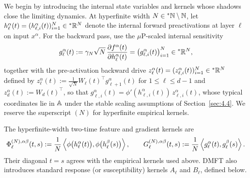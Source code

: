 We begin by introducing the internal state variables and kernels whose shadows close the limiting dynamics. At hyperfinite width $N \in {}^*\mathbb{N} \setminus \mathbb{N}$, let $h_\ell^\alpha(t) = (h_{\ell, i}^\alpha(t))_{i=1}^N \in {}^*\mathbb{R}^N$ denote the internal forward preactivations at layer $\ell$ on input $x^\alpha$. For the backward pass, use the $\mu$P-scaled internal sensitivity
\begin{equation}\label{eq:4.55}
g_\ell^\alpha(t) := \gamma_N \sqrt{N}\,\frac{\partial f^\alpha(t)}{\partial h_\ell^\alpha(t)} = \bigl(g_{\ell, i}^\alpha(t)\bigr)_{i=1}^N \in {}^*\mathbb{R}^N,
\end{equation}
together with the pre-activation backward drive $z_\ell^\alpha(t) = (z_{\ell, i}^\alpha(t))_{i=1}^N \in {}^*\mathbb{R}^N$ defined by $z_\ell^\alpha(t) := \frac{1}{\sqrt{N}}W_\ell(t)^\top g_{\ell+1}^\alpha(t)$ for $1 \le \ell \le d - 1$ and $z_d^\alpha(t) := W_d(t)^\top$, so that $g_{\ell, i}^\alpha(t) = \phi'(h_{\ell, i}^\alpha(t))\,z_{\ell, i}^\alpha(t)$, whose typical coordinates lie in $\mathbb{A}$ under the stable scaling assumptions of Section~\ref{sec:4.4}. We reserve the superscript $(N)$ for hyperfinite empirical kernels.

The hyperfinite-width two-time feature and gradient kernels are
\begin{equation}\label{eq:4.56}
\Phi_\ell^{(N),\alpha\beta}(t, s) := \frac{1}{N}\left\langle \phi\bigl(h_\ell^\alpha(t)\bigr), \phi\bigl(h_\ell^\beta(s)\bigr) \right\rangle, \qquad G_\ell^{(N),\alpha\beta}(t, s) := \frac{1}{N}\left\langle g_\ell^\alpha(t), g_\ell^\beta(s) \right\rangle.
\end{equation}
Their diagonal $t = s$ agrees with the empirical kernels used above. DMFT also introduces standard response (or susceptibility) kernels $A_\ell$ and $B_\ell$, defined below.

